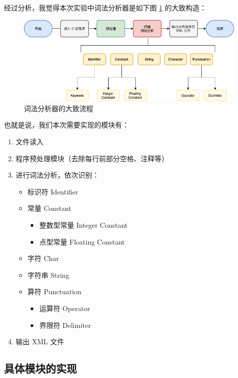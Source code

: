 \documentclass[UTF8]{ctexart}
\begin{document}
经过分析，我觉得本次实验中词法分析器是如下图 \ref{fig:figure1} 的大致构造：

\begin{figure}[h]
  \includegraphics[width=\linewidth]{images/lexical.png}
  \caption{词法分析器的大致流程}
  \label{fig:figure1}
\end{figure}

也就是说，我们本次需要实现的模块有：

\begin{enumerate}
  \item 文件读入
  \item 程序预处理模块（去除每行前部分空格、注释等）
  \item 进行词法分析，依次识别：
  \begin{itemize}
    \item 标识符 Identifier
    \item 常量 Constant
    \begin{itemize}
        \item 整数型常量 Integer Constant
        \item 点型常量 Floating Constant
    \end{itemize}
    \item 字符 Char
    \item 字符串 String
    \item 算符 Punctuation
      \begin{itemize}
        \item 运算符 Operator
        \item 界限符 Delimiter
      \end{itemize}
  \end{itemize}
  \item 输出 XML 文件
\end{enumerate}

\subsection{具体模块的实现}
\end{document}

